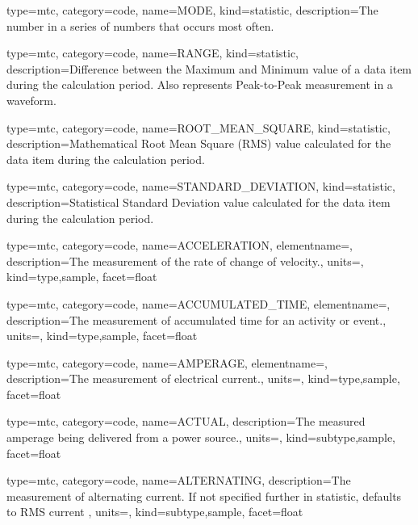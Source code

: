 {
  type=mtc,
  category=code,
  name={MODE},
  kind={statistic},
  description={The number in a series of numbers that occurs most often.}
}


{
  type=mtc,
  category=code,
  name={RANGE},
  kind={statistic},
  description={Difference between the Maximum and Minimum value of a data item during the calculation period.  Also represents Peak-to-Peak measurement in a waveform.}
}


{
  type=mtc,
  category=code,
  name={ROOT\_MEAN\_SQUARE},
  kind={statistic},
  description={Mathematical Root Mean Square (RMS) value calculated for the data item during the calculation period.}
}


{
  type=mtc,
  category=code,
  name={STANDARD\_DEVIATION},
  kind={statistic},
  description={Statistical Standard Deviation value calculated for the data item during the calculation period.}
}


{
  type=mtc,
  category=code,
  name={ACCELERATION},
  elementname=,
  description={The measurement of the rate of change of velocity.},
  units=,
  kind={type,sample},
  facet={\gls{float}}
}


{
  type=mtc,
  category=code,
  name={ACCUMULATED\_TIME},
  elementname=,
  description={The measurement of accumulated time for an activity or event.},
  units=,
  kind={type,sample},
  facet={\gls{float}}
}


{
  type=mtc,
  category=code,
  name={AMPERAGE},
  elementname=,
  description={The measurement of electrical current.},
  units=,
  kind={type,sample},
  facet={\gls{float}}
}


{
  type=mtc,
  category=code,
  name={ACTUAL},
  description={The measured amperage being delivered from a power source.},
  units=,
  kind={subtype,sample},
  facet={\gls{float}}
}


{
  type=mtc,
  category=code,
  name={ALTERNATING},
  description={The measurement of alternating current.   If not specified further in statistic, defaults to RMS current  },
  units=,
  kind={subtype,sample},
  facet={\gls{float}}
}


